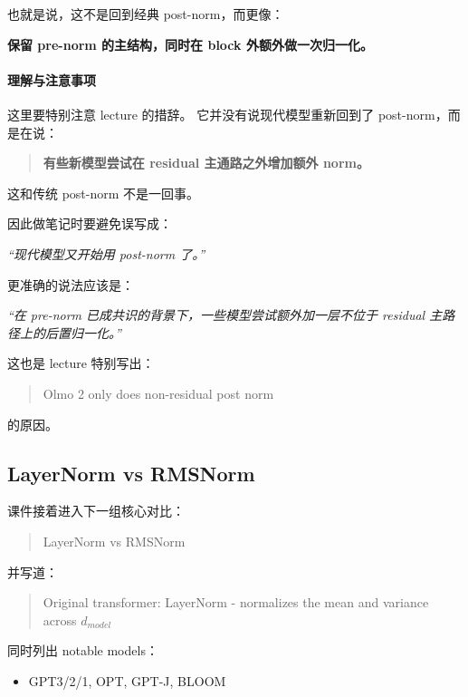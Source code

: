 \documentclass[a4paper,UTF8]{article}
\numberwithin{equation}{section}
\begin{document}
也就是说，这不是回到经典 post-norm，而更像：

\begin{center}
\textbf{保留 pre-norm 的主结构，同时在 block 外额外做一次归一化。}
\end{center}

\paragraph{理解与注意事项}
这里要特别注意 lecture 的措辞。  
它并没有说现代模型重新回到了 post-norm，而是在说：

\begin{quote}
\textbf{有些新模型尝试在 residual 主通路之外增加额外 norm。}
\end{quote}

这和传统 post-norm 不是一回事。

因此做笔记时要避免误写成：
\begin{center}
\emph{“现代模型又开始用 post-norm 了。”}
\end{center}

更准确的说法应该是：

\begin{center}
\emph{“在 pre-norm 已成共识的背景下，一些模型尝试额外加一层不位于 residual 主路径上的后置归一化。”}
\end{center}

这也是 lecture 特别写出：
\begin{quote}
Olmo 2 only does non-residual post norm
\end{quote}
的原因。

\subsection{LayerNorm vs RMSNorm}

课件接着进入下一组核心对比：
\begin{quote}
LayerNorm vs RMSNorm
\end{quote}

并写道：

\begin{quote}
Original transformer: LayerNorm - normalizes the mean and variance across \(d_{model}\)
\end{quote}

同时列出 notable models：
\begin{itemize}
    \item GPT3/2/1, OPT, GPT-J, BLOOM
\end{itemize}
\end{document}
